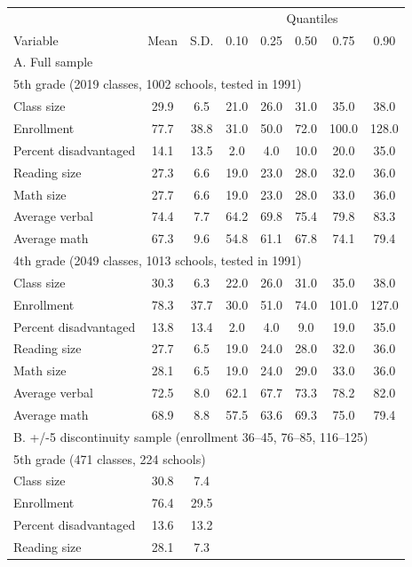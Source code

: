 \begin{tabular}{lccccccc}
\toprule
 & & & \multicolumn{5}{c}{Quantiles} \\
Variable & Mean & S.D. & 0.10 & 0.25 & 0.50 & 0.75 & 0.90 \\
\midrule
\multicolumn{8}{l}{A. Full sample} \\
\multicolumn{8}{l}{5th grade (2019 classes, 1002 schools, tested in 1991)} \\
Class size & 29.9 & 6.5 & 21.0 & 26.0 & 31.0 & 35.0 & 38.0 \\
Enrollment & 77.7 & 38.8 & 31.0 & 50.0 & 72.0 & 100.0 & 128.0 \\
Percent disadvantaged & 14.1 & 13.5 & 2.0 & 4.0 & 10.0 & 20.0 & 35.0 \\
Reading size & 27.3 & 6.6 & 19.0 & 23.0 & 28.0 & 32.0 & 36.0 \\
Math size & 27.7 & 6.6 & 19.0 & 23.0 & 28.0 & 33.0 & 36.0 \\
Average verbal & 74.4 & 7.7 & 64.2 & 69.8 & 75.4 & 79.8 & 83.3 \\
Average math & 67.3 & 9.6 & 54.8 & 61.1 & 67.8 & 74.1 & 79.4 \\
\multicolumn{8}{l}{4th grade (2049 classes, 1013 schools, tested in 1991)} \\
Class size & 30.3 & 6.3 & 22.0 & 26.0 & 31.0 & 35.0 & 38.0 \\
Enrollment & 78.3 & 37.7 & 30.0 & 51.0 & 74.0 & 101.0 & 127.0 \\
Percent disadvantaged & 13.8 & 13.4 & 2.0 & 4.0 & 9.0 & 19.0 & 35.0 \\
Reading size & 27.7 & 6.5 & 19.0 & 24.0 & 28.0 & 32.0 & 36.0 \\
Math size & 28.1 & 6.5 & 19.0 & 24.0 & 29.0 & 33.0 & 36.0 \\
Average verbal & 72.5 & 8.0 & 62.1 & 67.7 & 73.3 & 78.2 & 82.0 \\
Average math & 68.9 & 8.8 & 57.5 & 63.6 & 69.3 & 75.0 & 79.4 \\
\midrule
\multicolumn{8}{l}{B. +/-5 discontinuity sample (enrollment 36--45, 76--85, 116--125)} \\
\multicolumn{8}{l}{5th grade (471 classes, 224 schools)} \\
Class size & 30.8 & 7.4 & & & & & \\
Enrollment & 76.4 & 29.5 & & & & & \\
Percent disadvantaged & 13.6 & 13.2 & & & & & \\
Reading size & 28.1 & 7.3 & & & & & \\

\end{tabular}
